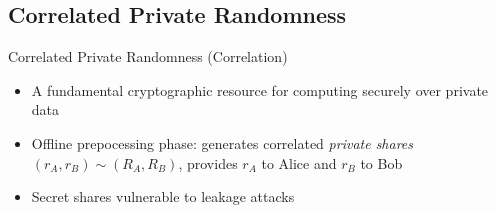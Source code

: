 \subsection{Correlated Private Randomness}
\begin{frame}{Correlated Private Randomness (Correlation)}
	\begin{itemize}
		\item A fundamental cryptographic resource for computing securely over private data
		\item Offline prepocessing phase: generates correlated {\em private shares} $ (r_A, r_B) \sim (R_A, R_B) $, provides $r_A$ to Alice and $r_B$ to Bob 
		\item Secret shares vulnerable to leakage attacks
	\end{itemize}
\end{frame}

%	
		
